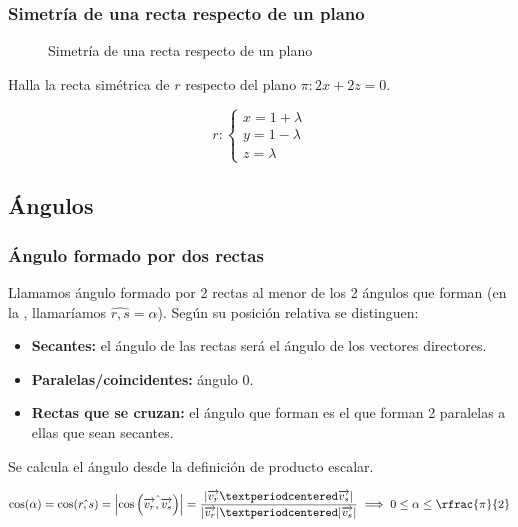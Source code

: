 \subsubsection{Simetría de una recta respecto de un plano}

\begin{figure}[H]
\centering
{}

\caption{Simetría de una recta respecto de un plano}
\label{fig::sim::recta-plano}
\end{figure}


\begin{problem}

Halla la recta simétrica de $r$ respecto del plano $\pi: 2x+2z=0$.

\[r: \begin{cases}x=1+\lambda\\y=1-\lambda\\z=\lambda\end{cases}\]

\solution


\end{problem}


\newpage
\subsection{Ángulos}
\subsubsection{Ángulo formado por dos rectas}

Llamamos ángulo formado por 2 rectas al menor de los 2 ángulos que forman (en la , llamaríamos $\widehat{r,s} = \alpha$). Según su posición relativa se distinguen:

\begin{itemize}
  \item \textbf{Secantes:} el ángulo de las rectas será el ángulo de los vectores directores.
  \item \textbf{Paralelas/coincidentes:} ángulo 0.
  \item \textbf{Rectas que se cruzan:} el ángulo que forman es el que forman 2 paralelas a ellas que sean secantes. 
\end{itemize}

Se calcula el ángulo desde la definición de producto escalar.

\[
\cos(\alpha) = \cos(\hat{r,s}) = \left| \cos\left(\hat{\vec{v_r},\vec{v_s}}\right)\right| = \frac{|\vec{v_r}·\vec{v_s}|}{|\vec{v_r}|·|\vec{v_s}|} \implies 0\leq \alpha \leq \rfrac{\pi}{2}
\]


